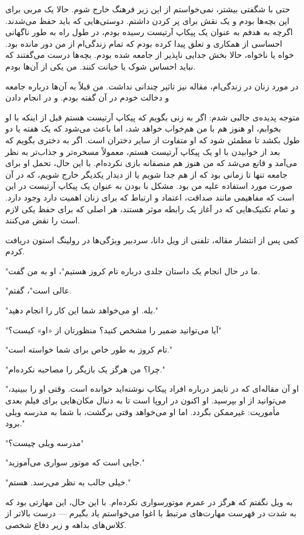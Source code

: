 حتی با شگفتی بیشتر، نمی‌خواستم از این زیر فرهنگ خارج شوم. حالا یک مربی برای این بچه‌ها بودم و یک نقش برای پر کردن داشتم. دوستی‌هایی که باید حفظ می‌شدند. اگرچه به هدفم به عنوان یک پیکاپ آرتیست رسیده بودم، در طول راه به طور ناگهانی احساسی از همکاری و تعلق پیدا کرده بودم که تمام زندگی‌ام از من دور مانده بود. خواه یا ناخواه، حالا بخش جدایی ناپذیر از جامعه شده بودم. بچه‌ها درست می‌گفتند که نباید احساس شوک یا خیانت کنند. من یکی از آن‌ها بودم.

در مورد زنان در زندگی‌ام، مقاله نیز تاثیر چندانی نداشت. من قبلاً به آن‌ها درباره جامعه و دخالت خودم در آن گفته بودم. و در انجام دادن

متوجه پدیده‌ی جالبی شدم: اگر به زنی بگویم که پیکاپ آرتیست هستم قبل از اینکه با او بخوابم، او هنوز هم با من هم‌خواب خواهد شد، اما باعث می‌شود که یک هفته یا دو طول بکشد تا مطمئن شود که او متفاوت از سایر دختران است. اگر به دختری بگویم که بعد از خوابیدن با او یک پیکاپ آرتیست هستم، معمولاً مسخره‌تر و جذاب‌تر به نظر می‌آمد و قانع می‌شد که من هنوز هم منصفانه بازی نکرده‌ام. با این حال، تحمل او برای جامعه تنها تا زمانی بود که از هم جدا شویم یا از دیدار یکدیگر خارج شویم، که در آن صورت مورد استفاده علیه من بود. مشکل با بودن به عنوان یک پیکاپ آرتیست در این است که مفاهیمی مانند صداقت، اعتماد و ارتباط که برای زنان اهمیت دارد وجود دارد. و تمام تکنیک‌هایی که در آغاز یک رابطه موثر هستند، هر اصلی که برای حفظ یکی لازم است را نقض می‌کنند.

کمی پس از انتشار مقاله، تلفنی از ویل دانا، سردبیر ویژگی‌ها در رولینگ استون دریافت کردم.

"ما در حال انجام یک داستان جلدی درباره تام کروز هستیم"، او به من گفت.

"عالی است"، گفتم.

"بله. او می‌خواهد شما این کار را انجام دهید."

"آیا می‌توانید ضمیر را مشخص کنید؟ منظورتان از «او» کیست؟"

"تام کروز به طور خاص برای شما خواسته است."

"چرا؟ من هرگز یک بازیگر را مصاحبه نکرده‌ام."

"او آن مقاله‌ای که در تایمز درباره افراد پیکاپ نوشته‌اید خوانده است. وقتی او را ببینید، می‌توانید از او بپرسید. او اکنون در اروپا است تا به دنبال مکان‌هایی برای فیلم بعدی مأموریت: غیرممکن بگردد. اما او می‌خواهد وقتی برگشت، با شما به مدرسه ویلی برود."

"مدرسه ویلی چیست؟"

"جایی است که موتور سواری می‌آموزید."

"خیلی جالب به نظر می‌رسد. هستم."

به ویل نگفتم که هرگز در عمرم موتورسواری نکرده‌ام. با این حال، این مهارتی بود که به شدت در فهرست مهارت‌های مرتبط با اغوا می‌خواستم یاد بگیرم — درست بالا‌تر از کلاس‌های بداهه و زیر دفاع شخصی.